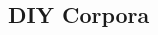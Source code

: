 \documentclass[a4paper,landscape,headrule,footrule,dvips]{foils}
\begin{document}
\begin{CJK}{UTF8}{min}




\section{DIY Corpora}


\end{CJK}
\end{document}
